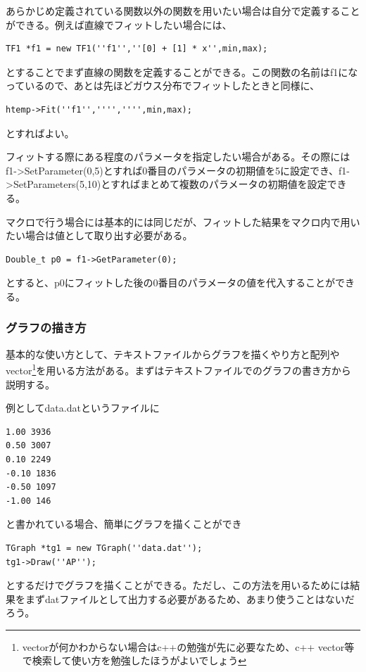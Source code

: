 \documentclass[10pt]{ujarticle}
\begin{document}
あらかじめ定義されている関数以外の関数を用いたい場合は自分で定義することができる。例えば直線でフィットしたい場合には、
\begin{lstlisting}[basicstyle=\ttfamily\footnotesize, frame=single]
TF1 *f1 = new TF1(''f1'',''[0] + [1] * x'',min,max);
 \end{lstlisting}
とすることでまず直線の関数を定義することができる。この関数の名前はf1になっているので、あとは先ほどガウス分布でフィットしたときと同様に、
\begin{lstlisting}[basicstyle=\ttfamily\footnotesize, frame=single]
htemp->Fit(''f1'','''','''',min,max);
 \end{lstlisting}
とすればよい。

フィットする際にある程度のパラメータを指定したい場合がある。その際にはf1->SetParameter(0,5)とすれば0番目のパラメータの初期値を5に設定でき、f1->SetParameters(5,10)とすればまとめて複数のパラメータの初期値を設定できる。

マクロで行う場合には基本的には同じだが、フィットした結果をマクロ内で用いたい場合は値として取り出す必要がある。
\begin{lstlisting}[basicstyle=\ttfamily\footnotesize, frame=single]
Double_t p0 = f1->GetParameter(0);
 \end{lstlisting}
とすると、p0にフィットした後の0番目のパラメータの値を代入することができる。

\subsubsection{グラフの描き方}
基本的な使い方として、テキストファイルからグラフを描くやり方と配列やvector\footnote{vectorが何かわからない場合はc++の勉強が先に必要なため、c++ vector等で検索して使い方を勉強したほうがよいでしょう}を用いる方法がある。まずはテキストファイルでのグラフの書き方から説明する。

例としてdata.datというファイルに
\begin{lstlisting}[basicstyle=\ttfamily\footnotesize, frame=single]
1.00 3936
0.50 3007
0.10 2249
-0.10 1836
-0.50 1097
-1.00 146
 \end{lstlisting}
 と書かれている場合、簡単にグラフを描くことができ
\begin{lstlisting}[basicstyle=\ttfamily\footnotesize, frame=single]
TGraph *tg1 = new TGraph(''data.dat'');
tg1->Draw(''AP'');
 \end{lstlisting}
とするだけでグラフを描くことができる。ただし、この方法を用いるためには結果をまずdatファイルとして出力する必要があるため、あまり使うことはないだろう。
\end{document}
